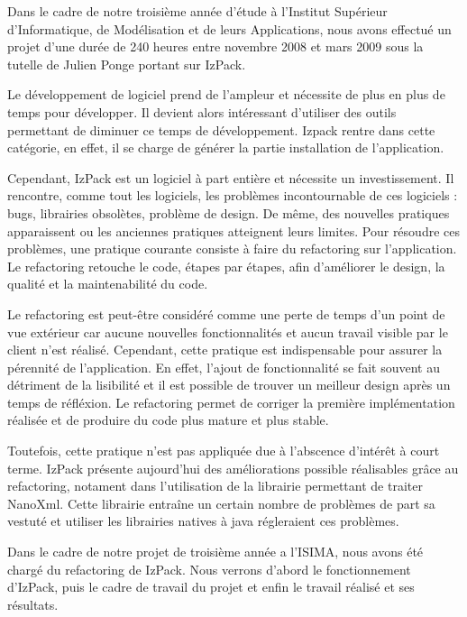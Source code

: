 Dans le cadre de notre troisième année d'étude à l'Institut Supérieur d'Informatique, de Modélisation et de leurs Applications, nous avons effectué un projet d'une durée de 240 heures entre novembre 2008 et mars 2009 sous la tutelle de Julien Ponge portant sur IzPack.

Le développement de logiciel prend de l'ampleur et nécessite de plus en plus de temps pour développer.
Il devient alors intéressant d'utiliser des outils permettant de diminuer ce temps de développement.
Izpack rentre dans cette catégorie, en effet, il se charge de générer la partie installation de l'application.

Cependant, IzPack est un logiciel à part entière et nécessite un investissement.
Il rencontre, comme tout les logiciels, les problèmes incontournable de ces logiciels : bugs, librairies obsolètes, problème de design.
De même, des nouvelles pratiques apparaissent ou les anciennes pratiques atteignent leurs limites.
Pour résoudre ces problèmes, une pratique courante consiste à faire du refactoring sur l'application.
Le refactoring retouche le code, étapes par étapes, afin d'améliorer le design, la qualité et la maintenabilité du code.

Le refactoring est peut-être considéré comme une perte de temps d'un point de vue extérieur car aucune nouvelles fonctionnalités et aucun travail visible par le client n'est réalisé.
Cependant, cette pratique est indispensable pour assurer la pérennité de l'application. 
En effet, l'ajout de fonctionnalité se fait souvent au détriment de la lisibilité et il est possible de trouver un meilleur design après un temps de réfléxion.
Le refactoring permet de corriger la première implémentation réalisée et de produire du code plus mature et plus stable.

Toutefois, cette pratique n'est pas appliquée due à l'abscence d'intérêt à court terme.
IzPack présente aujourd'hui des améliorations possible réalisables grâce au refactoring, notament dans l'utilisation de la librairie permettant de traiter NanoXml.
Cette librairie entraîne un certain nombre de problèmes de part sa vestuté et utiliser les librairies natives à java régleraient ces problèmes.

Dans le cadre de notre projet de troisième année a l'ISIMA, nous avons été chargé du refactoring de IzPack. 
Nous verrons d'abord le fonctionnement d'IzPack, puis le cadre de travail du projet et enfin le travail réalisé et ses résultats.
